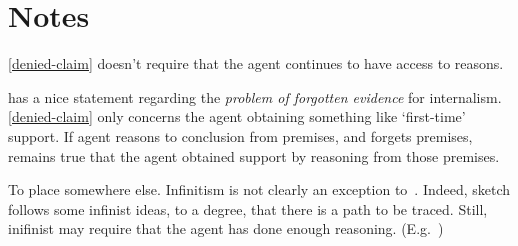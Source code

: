 \section{Notes}
\label{sec:notes}

\begin{note}[Memory]
  \ref{denied-claim} doesn't require that the agent continues to have access to reasons.

  \textcite[208]{Goldman:1999tr} has a nice statement regarding the \emph{problem of forgotten evidence} for internalism.
  \ref{denied-claim} only concerns the agent obtaining something like `first-time' support.
  If agent reasons to conclusion from premises, and forgets premises, remains true that the agent obtained support by reasoning from those premises.
\end{note}


\begin{note}
  {
    \color{red}
    To place somewhere else.
  }
  Infinitism is not clearly an exception to~\ESU{}.
  Indeed, sketch follows some infinist ideas, to a degree, that there is a path to be traced.
  Still, inifinist may require that the agent has done enough reasoning.
  (E.g.\ \textcite[10]{Klein:2007ve})
\end{note}